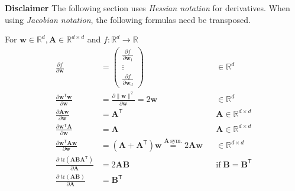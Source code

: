 \newpar{}
\textbf{Disclaimer} The following section uses \textit{Hessian notation} for derivatives. When using \textit{Jacobian notation}, the following formulas need be transposed.

\newpar{}
For $\mathbf{w}\in \mathbb{R}^d, \mathbf{A}\in \mathbb{R}^{d\times d}$ and $ f: \mathbb{R}^d\to \mathbb{R}$
\noindent\begin{align*}
    \frac{\partial f}{\partial \mathbf{w}}                                        & =
    \begin{pmatrix}\frac{\partial f}{\partial \mathbf{w}_1} \\
        \vdots                                   \\
        \frac{\partial f}{\partial \mathbf{w}_d}
    \end{pmatrix}       &                                                                                                                 & \in \mathbb{R}^d                                                                                                                \\[2em]
    \frac{\partial \mathbf{w}^{\mathsf{T}}\mathbf{w}}{\partial \mathbf{w}}        & =\frac{\partial\|\mathbf{w}\|^2}{\partial \mathbf{w}}=2\mathbf{w}                                               &                  & \in \mathbb{R}^d                                   \\
    \frac{\partial \mathbf{A}\mathbf{w}}{\partial \mathbf{w}}                     & ={\mathbf{A}}^{\mathsf{T}}                                                                                      &                  & \mathbf{A}\in \mathbb{R}^{d\times d}               \\
    \frac{\partial \mathbf{w}^{\mathsf{T}}\mathbf{A}}{\partial \mathbf{w}}        & = \mathbf{A}                                                                                                    &                  & \mathbf{A}\in \mathbb{R}^{d\times d}               \\
    \frac{\partial \mathbf{w}^{\mathsf{T}}\mathbf{Aw}}{\partial \mathbf{w}}       & = \left(\mathbf{A}+\mathbf{A}^{\mathsf{T}}\right)\mathbf{w} \overset{\mathbf{A}\ \mathrm{sym.}}{=} 2\mathbf{Aw} &                  & \in \mathbb{R}^{d\times d}                         \\
    \frac{\partial\; \mathrm{tr}(\mathbf{ABA}^{\mathsf{T}})}{\partial \mathbf{A}} & = 2 \mathbf{AB}                                                                                                 &                  & \mathrm{if}\; \mathbf{B} = \mathbf{B}^{\mathsf{T}} \\
    \frac{\partial\; \mathrm{tr}(\mathbf{AB})}{\partial \mathbf{A}}               & = \mathbf{B}^{\mathsf{T}}                                                                                       &                  & 
\end{align*}

